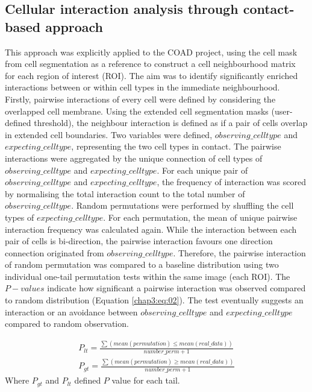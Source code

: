 \subsection{Cellular interaction analysis through contact-based approach}
\label{chap3:sub4:contact_based_interaction}
This approach was explicitly applied to the COAD project, using the cell mask from cell segmentation as a reference to construct a cell neighbourhood matrix for each region of interest (ROI). The aim was to identify significantly enriched interactions between or within cell types in the immediate neighbourhood. Firstly, pairwise interactions of every cell were defined by considering the overlapped cell membrane. Using the extended cell segmentation masks (user-defined threshold), the neighbour interaction is defined as if a pair of cells overlap in extended cell boundaries. Two variables were defined, $observing\_celltype$ and $expecting\_celltype$, representing the two cell types in contact. The pairwise interactions were aggregated by the unique connection of cell types of $observing\_celltype$ and $expecting\_celltype$. For each unique pair of $observing\_celltype$ and $expecting\_celltype$, the frequency of interaction was scored by normalising the total interaction count to the total number of $observing\_celltype$. Random permutations were performed by shuffling the cell types of $expecting\_celltype$. For each permutation, the mean of unique pairwise interaction frequency was calculated again. While the interaction between each pair of cells is bi-direction, the pairwise interaction favours one direction connection originated from $observing\_celltype$. Therefore, the pairwise interaction of random permutation was compared to a baseline distribution using two individual one-tail permutation tests within the same image (each ROI). The $P-values$ indicate how significant a pairwise interaction was observed compared to random distribution (Equation \ref{chap3:eq:02}). The test eventually suggests an interaction or an avoidance between $observing\_celltype$ and $expecting\_celltype$ compared to random observation.

\begin{equation}
\begin{split}
P_{lt} = \frac{ \sum(mean(permutation) \leq mean(real\_data) )}{number\_perm + 1} \\
P_{gt} = \frac{\sum(mean(permutation) \geq mean(real\_data) )}{number\_perm + 1}
\label{chap3:eq:02}
\end{split}
\end{equation}
Where $P_{gt}$ and $P_{lt}$ defined $P$ value for each tail.


